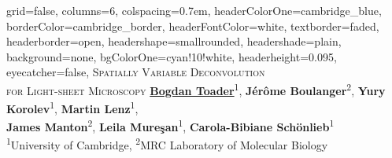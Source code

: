 \documentclass[a0paper,portrait,fontscale=0.35]{baposter}
\theoremstyle{plain}
\theoremstyle{plain}
\theoremstyle{definition}
\theoremstyle{plain}
\theoremstyle{definition}
\begin{document}

\begin{poster}
{
    grid=false,
    columns=6,
    colspacing=0.7em,
    headerColorOne=cambridge_blue,
    borderColor=cambridge_border,
    headerFontColor=white,
    textborder=faded,
    headerborder=open,
    headershape=smallrounded,
    headershade=plain,
    background=none,
    bgColorOne=cyan!10!white,
    headerheight=0.095\textheight,
    eyecatcher=false,
}
{
}
{
  \textsc{Spatially Variable Deconvolution\vspace{0.2cm}\\ 
    for Light-sheet Microscopy\vspace{0.2em}}
}
{
  \vspace{0.1em}
  \hspace{-0.65em}
  {
    \underline{\textbf{Bogdan Toader}}\textsuperscript{1},
    \textbf{J\'{e}r\^{o}me Boulanger}\textsuperscript{2},
    \textbf{Yury Korolev}\textsuperscript{1},
    \textbf{Martin Lenz}\textsuperscript{1},\\
    \textbf{James Manton}\textsuperscript{2},
    \textbf{Leila Mure\c{s}an}\textsuperscript{1},
    \textbf{Carola-Bibiane Sch\"{o}nlieb}\textsuperscript{1}
  } \\[0.2em]
  {
    \textsuperscript{1}University of Cambridge,
    \textsuperscript{2}MRC Laboratory of Molecular Biology 
  }
  \vspace{-1em}
}

\end{poster}
\end{document}
